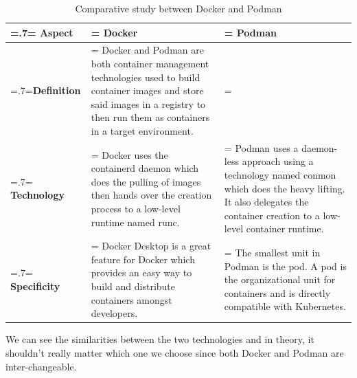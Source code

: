 \begin{table}[H]
    \renewcommand{\arraystretch}{1.5}%
    \caption{Comparative study between Docker and Podman}
    \centering
    \medskip
    \begin{tabularx}{1\textwidth} {
            | >{\hsize=.7\hsize\linewidth=\hsize\centering\arraybackslash}X
            | >{\hsize=1.15\hsize\linewidth=\hsize\justifying\arraybackslash}X
            | >{\hsize=1.15\hsize\linewidth=\hsize\justifying\arraybackslash}X |}
        \hline
        \rowcolor{primary} \textbf {Aspect} & \textbf {Docker}                                                                                                                                                                                                                    & \textbf {Podman}                                                                                                                                                                      \\
        \hline
        \textbf {Definition}                & \multicolumn{2}{|>{\hsize=2.35\hsize}X|} {Docker and Podman are both  container management technologies used to build container images and store said images in a registry to then run them as containers in a target environment.}                                                                                                                                                                                         \\
        \hline
        \textbf {Technology}                & \noindent Docker uses the containerd daemon which does the pulling of images then hands over the creation process to a low-level runtime named runc.                                                                                & \noindent Podman uses a daemon-less approach using a technology named conmon which does the heavy lifting. It also delegates the container creation to a low-level container runtime. \\
        \hline
        \textbf {Specificity}               & \noindent Docker Desktop is a great feature for Docker which provides an easy way to build and distribute containers amongst developers.                                                                                            & \noindent The smallest unit in Podman is the pod. A pod is the organizational unit for containers and is directly compatible with Kubernetes.                                         \\
        \hline
    \end{tabularx}
\end{table}
We can see the similarities between the two technologies and in theory, it shouldn't really matter which one we choose since both Docker and Podman are inter-changeable.

